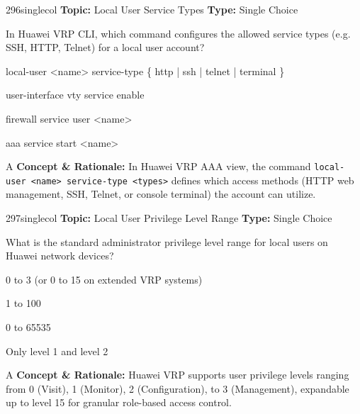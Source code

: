 \begin{qcard}{296}{singlecol}
\textcolor{darkslate!75}{\small\textbf{Topic:} Local User Service Types \hfill \textbf{Type:} Single Choice}\vspace{0.4em}\par
In Huawei VRP CLI, which command configures the allowed service types (e.g. SSH, HTTP, Telnet) for a local user account?
\begin{qoptions}
\item local-user \textless{}name\textgreater{} service-type \{ http | ssh | telnet | terminal \}
\item user-interface vty service enable
\item firewall service user \textless{}name\textgreater{}
\item aaa service start \textless{}name\textgreater{}
\end{qoptions}
\end{qcard}
\nopagebreak
\begin{explainbox}{A}
\textbf{Concept \& Rationale:} In Huawei VRP AAA view, the command \texttt{local-user \textless{}name\textgreater{} service-type \textless{}types\textgreater{}} defines which access methods (HTTP web management, SSH, Telnet, or console terminal) the account can utilize.
\end{explainbox}

\begin{qcard}{297}{singlecol}
\textcolor{darkslate!75}{\small\textbf{Topic:} Local User Privilege Level Range \hfill \textbf{Type:} Single Choice}\vspace{0.4em}\par
What is the standard administrator privilege level range for local users on Huawei network devices?
\begin{qoptions}
\item 0 to 3 (or 0 to 15 on extended VRP systems)
\item 1 to 100
\item 0 to 65535
\item Only level 1 and level 2
\end{qoptions}
\end{qcard}
\nopagebreak
\begin{explainbox}{A}
\textbf{Concept \& Rationale:} Huawei VRP supports user privilege levels ranging from 0 (Visit), 1 (Monitor), 2 (Configuration), to 3 (Management), expandable up to level 15 for granular role-based access control.
\end{explainbox}

